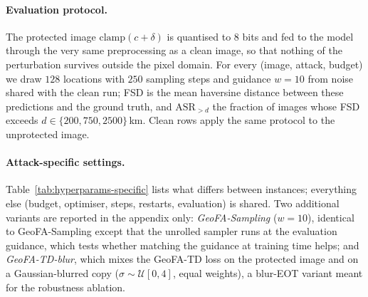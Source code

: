 \paragraph{Evaluation protocol.}
The protected image $\mathrm{clamp}(c+\delta)$ is quantised to 8 bits and fed to the model
through the very same preprocessing as a clean image, so that nothing of the perturbation
survives outside the pixel domain. For every (image, attack, budget) we draw $128$ locations
with $250$ sampling steps and guidance $w=10$ from noise shared with the clean run; FSD is the
mean haversine distance between these predictions and the ground truth, and
$\mathrm{ASR}_{>d}$ the fraction of images whose FSD exceeds $d \in \{200, 750, 2500\}$\,km.
Clean rows apply the same protocol to the unprotected image.

\paragraph{Attack-specific settings.}
Table~\ref{tab:hyperparams-specific} lists what differs between instances; everything else
(budget, optimiser, steps, restarts, evaluation) is shared. Two additional variants are
reported in the appendix only: \emph{GeoFA-Sampling} ($w{=}10$), identical to GeoFA-Sampling
except that the unrolled sampler runs at the evaluation guidance, which tests whether matching
the guidance at training time helps; and \emph{GeoFA-TD-blur}, which mixes the GeoFA-TD loss on
the protected image and on a Gaussian-blurred copy ($\sigma \sim \mathcal{U}[0,4]$, equal
weights), a blur-EOT variant meant for the robustness ablation.

